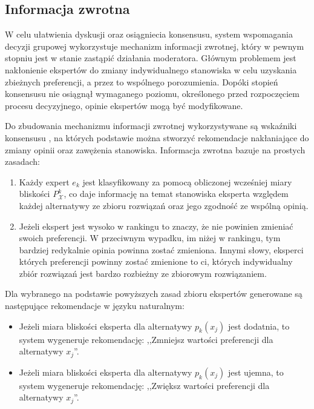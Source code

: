 \subsection{Informacja zwrotna}
W celu ułatwienia dyskusji oraz osiągniecia konsensusu, system wspomagania
decyzji grupowej wykorzystuje mechanizm informacji zwrotnej, który w pewnym
stopniu jest w stanie zastąpić działania moderatora. Głównym problemem jest
nakłonienie ekspertów do zmiany indywidualnego stanowiska w celu uzyskania
zbieżnych preferencji, a przez to wspólnego porozumienia. Dopóki stopień
konsensusu nie osiągnął wymaganego poziomu, określonego przed rozpoczęciem
procesu decyzyjnego, opinie ekspertów mogą być modyfikowane.

Do zbudowania mechanizmu informacji zwrotnej wykorzystywane są wskaźniki
konsensusu \cite{Perez2011}, na których podstawie można stworzyć rekomendacje
nakłaniające do zmiany opinii oraz zawężenia stanowiska. Informacja zwrotna
bazuje na prostych zasadach:
\begin{enumerate}
  \item Każdy expert $e_k$ jest klasyfikowany za pomocą obliczonej wcześniej
  miary bliskości $P^k_{\mathcal{X}}$, co daje informację na temat stanowiska
  eksperta względem każdej alternatywy ze zbioru rozwiązań oraz jego zgodność ze
  wspólną opinią.
  \item Jeżeli ekspert jest wysoko w rankingu to znaczy, że nie powinien
  zmieniać swoich preferencji. W przeciwnym wypadku, im niżej w rankingu, tym
  bardziej redykalnie opinia powinna zostać zmieniona. Innymi słowy, eksperci
  których preferencji powinny zostać zmienione to ci, których indywidualny zbiór
  rozwiązań jest bardzo rozbieżny ze zbiorowym rozwiązaniem.
\end{enumerate}
Dla wybranego na podstawie powyższych zasad zbioru ekspertów generowane są
następujące rekomendacje w języku naturalnym:
\begin{itemize}
  \item Jeżeli miara bliskości eksperta dla alternatywy $p_k(x_j)$ jest
  dodatnia, to system wygeneruje rekomendację: ,,Zmniejsz wartości preferencji
  dla alternatywy $x_j$''.
  \item Jeżeli miara bliskości eksperta dla alternatywy $p_k(x_j)$ jest ujemna,
  to system wygeneruje rekomendację: ,,Zwiększ wartości preferencji dla
  alternatywy $x_j$''.
\end{itemize}
